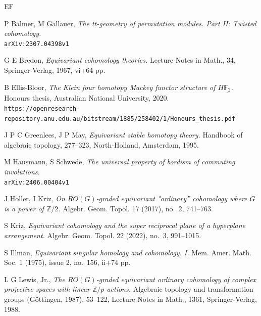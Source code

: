 \documentclass{amsart}[12pt]
\newcommand{\mF}{{\mathbb F}}
\newcommand{\mZ}{{\mathbb Z}}
\numberwithin{equation}{section}
\theoremstyle{definition}
\begin{document}
\begin{thebibliography}{EF}
  
  P Balmer, M Gallauer, {\em The tt-geometry of permutation modules. Part II: Twisted cohomology.}\\
  \verb!arXiv:2307.04398v1!  

  G E Bredon, {\em Equivariant cohomology theories.}
  Lecture Notes in Math., 34, Springer-Verlag, 1967, vi+64 pp.

  B Ellis-Bloor, {\em The Klein four homotopy Mackey functor structure of $H\underline{\mF_2}$.}
  Honours thesis, Australian National University, 2020.\\
  \verb!https://openresearch-repository.anu.edu.au/bitstream/1885/258402/1/Honours_thesis.pdf!
  
  J P C Greenlees, J P May, {\em Equivariant stable homotopy theory.}
  Handbook of algebraic topology, 277--323, North-Holland, Amsterdam, 1995. 

  M Hausmann, S Schwede,
  {\em The universal property of bordism of commuting involutions.}\\
    \verb!arXiv:2406.00404v1!  

  J Holler, I Kriz,
  {\em On $RO(G)$-graded equivariant "ordinary'' cohomology where $G$ is a power of $\mZ/2$.}
  Algebr. Geom. Topol. 17 (2017), no.\ 2, 741--763.

	S Kriz,
	{\em Equivariant cohomology and the super reciprocal plane of a
              hyperplane arrangement.}
	Algebr. Geom. Topol. 22 (2022), no.\ 3, 991--1015.

  S Illman, {\em Equivariant singular homology and cohomology. I.}
  Mem. Amer. Math. Soc. 1 (1975), issue 2, no.\ 156, ii+74 pp. 
  
  L G Lewis, Jr.,
  {\em The $R O(G)$-graded equivariant ordinary cohomology of complex projective spaces
    with linear $\mZ/p$ actions.}
  Algebraic topology and transformation groups (G{\"o}ttingen, 1987), 53--122,
  Lecture Notes in Math., 1361, Springer-Verlag, 1988.

\end{thebibliography}
\end{document}
